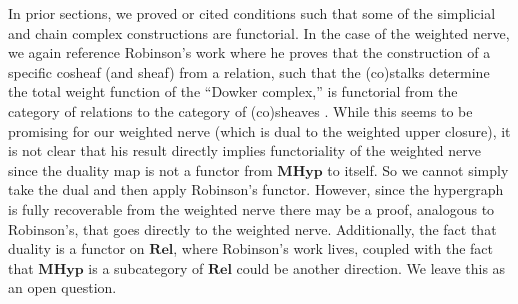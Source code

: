 \documentclass{amsart}
\newcommand{\MHyp}{\mathrm{\textbf{MHyp}}}
\newcommand{\Rel}{\mathrm{\textbf{Rel}}}
\newcommand{\cEP}[1]{{\textcolor{blue}{[Comment from Emilie: #1]}}}
\begin{document}
In prior sections, we proved or cited conditions such that some of the simplicial and chain complex constructions are functorial.
In the case of the weighted nerve, we again reference Robinson's work where he proves that the construction of a specific cosheaf (and sheaf) from a relation, such that the (co)stalks determine the total weight function of the ``Dowker complex,'' is functorial from the category of relations to the category of (co)sheaves \cite[Theorems 4 and 5]{robinson2022cosheaf}.
While this seems to be promising for our weighted nerve (which is dual to the weighted upper closure), it is not clear that his result directly implies functoriality of the weighted nerve since the duality map is not a functor from $\MHyp$ to itself. 
So we cannot simply take the dual and then apply Robinson's functor.
However, since the hypergraph is fully recoverable from the weighted nerve there may be a proof, analogous to Robinson's, that goes directly to the weighted nerve.
Additionally, the fact that duality is a functor on $\Rel$, where Robinson's work lives, coupled with the fact that $\MHyp$ is a subcategory of $\Rel$ could be another direction.
We leave this as an open question.


\end{document}
